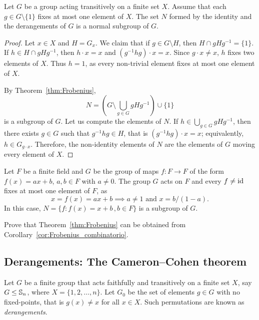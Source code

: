 \begin{corollary}[Frobenius]
    \label{cor:Frobenius_combinatorio}
    Let $G$ be a group acting transitively on a finite set $X$. 
    Assume that each $g\in G\setminus\{1\}$ fixes 
    at most one element of 
     $X$. The set $N$ formed by the identity and the derangements 
     of $G$ is a normal subgroup of $G$.
\end{corollary}

\begin{proof}
  Let $x\in X$ and $H=G_x$. We claim that 
  if $g\in G\setminus H$, then $H\cap
  gHg^{-1}=\{1\}$. If $h\in H\cap gHg^{-1}$, then
  $h\cdot x=x$ and $(g^{-1}hg)\cdot
  x=x$. Since $g\cdot x\ne x$, $h$ fixes two elements of
  $X$. Thus 
  $h=1$, as every non-trivial element fixes at most one element of $X$. 

  By Theorem~\ref{thm:Frobenius}, 
  \[
    N=\left(G\setminus\bigcup_{g\in G}gHg^{-1}\right)\cup\{1\}
  \]
  is a subgroup of $G$. Let us compute the elements of $N$. If 
  $h\in\bigcup_{g\in G}gHg^{-1}$, then there exists  $g\in G$ such that $g^{-1}hg\in H$,
  that is $(g^{-1}hg)\cdot x=x$; equivalently, 
  $h\in G_{g\cdot x}$. Therefore, the 
  non-identity elements of $N$ are the elements of $G$
  moving every element of $X$.
\end{proof}

\begin{example}
  Let $F$ be a finite field and $G$ be the group of maps 
  $f\colon F\to F$ of the form 
  $f(x)=ax+b$, $a,b\in F$ with $a\ne0$. The group $G$ acts on 
  $F$ and every 
  $f\ne\operatorname{id}$ fixes at most one element of $F$, as 
  \[
	x=f(x)=ax+b\implies a\ne 1\text{ and } x=b/(1-a).
  \]
  In this case, $N=\{f:f(x)=x+b\,,b\in F\}$ 
  is a subgroup of $G$.
\end{example}

\begin{exercise}
    Prove that Theorem~\ref{thm:Frobenius} can be obtained from
    Corollary~\ref{cor:Frobenius_combinatorio}.
\end{exercise}

\subsection{Derangements: The Cameron--Cohen theorem}

Let $G$ be a finite group that acts faithfully and transitively 
on a finite set $X$, say 
$G\leq\mathbb{S}_n$, where $X=\{1,2,\dots,n\}$. Let 
$G_0$ be the set of elements $g\in G$ with no fixed-points, 
that is $g(x)\ne x$ for all $x\in X$. 
Such permutations are known as \emph{derangements}. 


